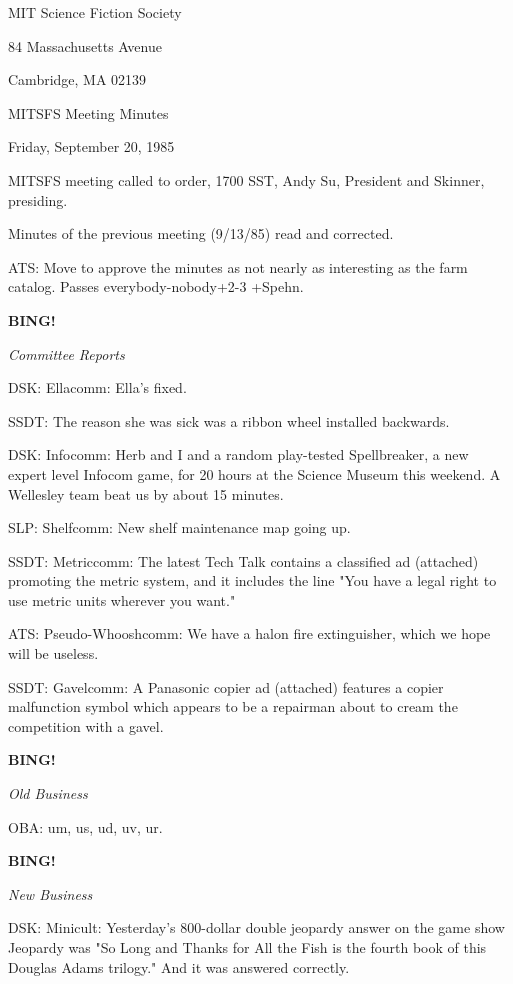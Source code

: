 \documentclass[12pt]{article}
\newcommand{\bing}{{\bf BING!} }
\newcommand{\goto}[1]{\bing \vskip 12pt \centerline{{\em{#1}}}}
\begin{document}
\begin{center}

MIT Science Fiction Society 

84 Massachusetts Avenue

Cambridge, MA 02139

\vspace{12pt}

MITSFS Meeting Minutes 

Friday, September 20, 1985

\end{center}
 
\vspace{18pt}

\setlength{\parskip}{6pt}

\noindent
MITSFS meeting called to order, 1700 SST,
Andy Su, President and Skinner, presiding.

Minutes of the previous meeting (9/13/85) read and corrected.

ATS: Move to approve the minutes as not nearly as interesting as the farm catalog. Passes everybody-nobody+2-3 +Spehn.

\goto{Committee Reports}

DSK: Ellacomm: Ella's fixed.

SSDT: The reason she was sick was a ribbon wheel installed backwards.

DSK: Infocomm: Herb and I and a random play-tested Spellbreaker, a new expert level Infocom game, for 20 hours at the Science Museum this weekend. A Wellesley team beat us by about 15 minutes.

SLP: Shelfcomm: New shelf maintenance map going up.

SSDT: Metriccomm: The latest Tech Talk contains a classified ad (attached) promoting the metric system, and it includes the line "You have a legal right to use metric units wherever you want."

ATS: Pseudo-Whooshcomm: We have a halon fire extinguisher, which we hope will be useless.

SSDT: Gavelcomm: A Panasonic copier ad (attached) features a copier malfunction symbol which appears to be a repairman about to cream the competition with a gavel.

\goto{Old Business}

OBA: um, us, ud, uv, ur.

\goto{New Business}

DSK: Minicult: Yesterday's 800-dollar double jeopardy answer on the game show Jeopardy was "So Long and Thanks for All the Fish is the fourth book of this Douglas Adams trilogy." And it was answered correctly.
\end{document}
